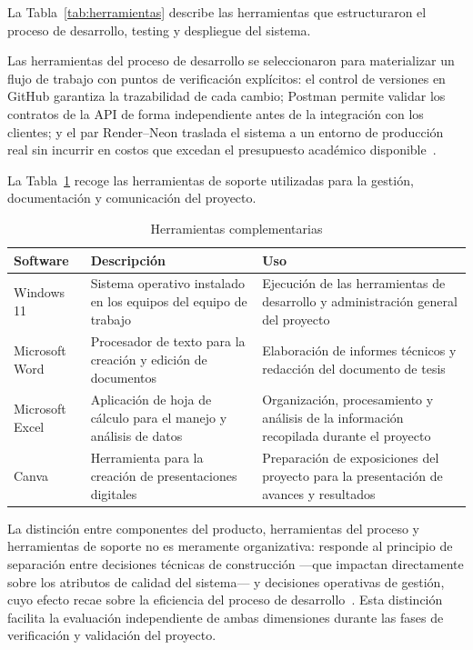 				La Tabla~\ref{tab:herramientas} describe las herramientas que estructuraron el proceso de desarrollo, testing y despliegue del sistema.
				
				Las herramientas del proceso de desarrollo se seleccionaron para materializar un flujo de trabajo con puntos de verificación explícitos: el control de versiones en GitHub garantiza la trazabilidad de cada cambio; Postman permite validar los contratos de la API de forma independiente antes de la integración con los clientes; y el par Render--Neon traslada el sistema a un entorno de producción real sin incurrir en costos que excedan el presupuesto académico disponible~\cite{GuerreroUlloa2024,Fowler2002}.
				
				
				La Tabla~\ref{tab:complementarias} recoge las herramientas de soporte utilizadas para la gestión, documentación y comunicación del proyecto.
				
				\begin{table}[H]
					\centering
					\small
					\caption{Herramientas complementarias}
					\label{tab:complementarias}
					\begin{tabular}{p{2.5cm}p{4.9cm}p{7.0cm}}
						\hline
						\textbf{Software} & \textbf{Descripción} & \textbf{Uso} \\
						\hline
						Windows 11 & Sistema operativo instalado en los equipos del equipo de trabajo & Ejecución de las herramientas de desarrollo y administración general del proyecto \\
						
						Microsoft Word & Procesador de texto para la creación y edición de documentos & Elaboración de informes técnicos y redacción del documento de tesis \\
						
						Microsoft Excel & Aplicación de hoja de cálculo para el manejo y análisis de datos & Organización, procesamiento y análisis de la información recopilada durante el proyecto \\
						
						Canva & Herramienta para la creación de presentaciones digitales & Preparación de exposiciones del proyecto para la presentación de avances y resultados \\
						\hline
					\end{tabular}
				\end{table}
				\tblnote
				
				La distinción entre componentes del producto, herramientas del proceso y herramientas de soporte no es meramente organizativa: responde al principio de separación entre decisiones técnicas de construcción ---que impactan directamente sobre los atributos de calidad del sistema--- y decisiones operativas de gestión, cuyo efecto recae sobre la eficiencia del proceso de desarrollo~\cite{Fowler2002}. Esta distinción facilita la evaluación independiente de ambas dimensiones durante las fases de verificación y validación del proyecto.
				
